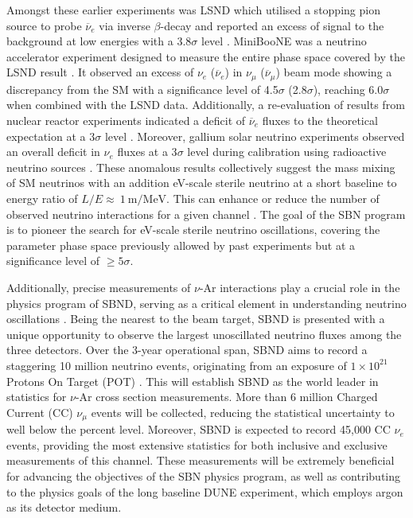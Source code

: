 Amongst these earlier experiments was LSND which utilised a stopping pion source to probe $\overline{\nu}_{e}$ via inverse $\beta$-decay and reported an excess of signal to the background at low energies with a 3.8$\sigma$ level \cite{LSND_anomaly}. 
MiniBooNE was a neutrino accelerator experiment designed to measure the entire phase space covered by the LSND result \cite{Miniboone_anomaly}.
It observed an excess of $\nu_{e}$ ($\overline{\nu}_{e}$) in $\nu_{\mu}$ ($\overline{\nu}_{\mu}$) beam mode showing a discrepancy from the SM with a significance level of 4.5$\sigma$ (2.8$\sigma$), reaching 6.0$\sigma$ when combined with the LSND data.
Additionally, a re-evaluation of results from nuclear reactor experiments indicated a deficit of $\overline{\nu}_{e}$ fluxes to the theoretical expectation at a 3$\sigma$ level \cite{reactor_anomaly_1, reactor_anomaly_2}. 
Moreover, gallium solar neutrino experiments observed an overall deficit in $\nu_{e}$ fluxes at a 3$\sigma$ level during calibration using radioactive neutrino sources \cite{galium_anomaly_1, galium_anomaly_2}.
These anomalous results collectively suggest the mass mixing of SM neutrinos with an addition eV-scale sterile neutrino at a short baseline to energy ratio of $L/E \approx~1~\mathrm{m/MeV}$.
This can enhance or reduce the number of observed neutrino interactions for a given channel \cite{SBNProgram}.
The goal of the SBN program is to pioneer the search for eV-scale sterile neutrino oscillations, covering the parameter phase space previously allowed by past experiments but at a significance level of $\geq 5 \sigma$.

Additionally, precise measurements of $\nu$-Ar interactions play a crucial role in the physics program of SBND, serving as a critical element in understanding neutrino oscillations \cite{NuSTECWhitePaper}. 
Being the nearest to the beam target, SBND is presented with a unique opportunity to observe the largest unoscillated neutrino fluxes among the three detectors.
Over the 3-year operational span, SBND aims to record a staggering 10 million neutrino events, originating from an exposure of $1 \times 10^{21}$ Protons On Target (POT) \cite{SBNProgram}.
This will establish SBND as the world leader in statistics for $\nu$-Ar cross section measurements.
More than 6 million Charged Current (CC) $\nu_{\mu}$ events will be collected, reducing the statistical uncertainty to well below the percent level.
Moreover, SBND is expected to record 45,000 CC $\nu_{e}$ events, providing the most extensive statistics for both inclusive and exclusive measurements of this channel.
These measurements will be extremely beneficial for advancing the objectives of the SBN physics program, as well as contributing to the physics goals of the long baseline DUNE experiment, which employs argon as its detector medium.

